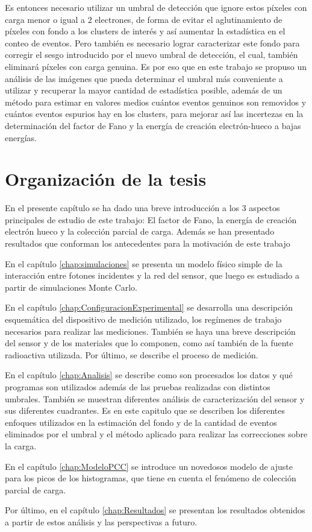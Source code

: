 Es entonces necesario utilizar un umbral de detección que ignore estos píxeles con carga menor o igual a $2$ electrones, de forma de evitar el aglutinamiento de píxeles con fondo a los clusters de interés y así aumentar la estadística en el conteo de eventos. Pero también es necesario lograr caracterizar este fondo para corregir el sesgo introducido por el nuevo umbral de detección, el cual, también eliminará píxeles con carga genuina. Es por eso que en este trabajo se propuso un análisis de las imágenes que pueda determinar el umbral más conveniente a utilizar y recuperar la mayor cantidad de estadística posible, además de un método para estimar en valores medios cuántos eventos genuinos son removidos y cuántos eventos espurios hay en los clusters, para mejorar así las incertezas en la determinación del factor de Fano y la energía de creación electrón-hueco a bajas energías.
\section{Organización de la tesis}
\noindent En el presente capítulo se ha dado una breve introducción a los 3 aspectos principales de estudio de este trabajo: El factor de Fano, la energía de creación electrón hueco y la colección parcial de carga. Además se han presentado resultados que conforman los antecedentes para la motivación de este trabajo

En el capítulo \ref{chap:simulaciones} se presenta un modelo físico simple de la interacción entre fotones incidentes y la red del sensor, que luego es estudiado a partir de simulaciones Monte Carlo.

En el capítulo \ref{chap:ConfiguracionExperimental} se desarrolla una descripción esquemática del dispositivo de medición utilizado, los regímenes de trabajo necesarios para realizar las mediciones. También se haya una breve descripción del sensor y de los materiales que lo componen, como así también de la fuente radioactiva utilizada. Por último, se describe el proceso de medición.

En el capítulo \ref{chap:Analisis} se describe como son procesados los datos y qué programas son utilizados además de las pruebas realizadas con distintos umbrales. También se muestran diferentes análisis de caracterización del sensor y sus diferentes cuadrantes. Es en este capitulo que se describen los diferentes enfoques utilizados en la estimación del fondo y de la cantidad de eventos eliminados por el umbral y el método aplicado para realizar las correcciones sobre la carga.

En el capítulo \ref{chap:ModeloPCC} se introduce un novedosos modelo de ajuste para los picos de los histogramas, que tiene en cuenta el fenómeno de colección parcial de carga.

Por último, en el capítulo \ref{chap:Resultados} se presentan los resultados obtenidos a partir de estos análisis y las perspectivas a futuro.


